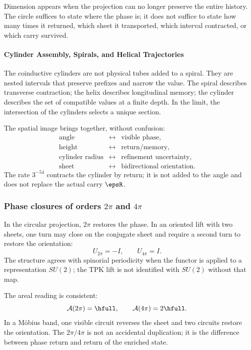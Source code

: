 \begin{narrativebox}
Dimension appears when the projection can no longer preserve the entire
history. The circle suffices to state where the phase is; it does not
suffice to state how many times it returned, which sheet it transported,
which interval contracted, or which carry survived.
\end{narrativebox}

\paragraph{Cylinder Assembly, Spirals, and Helical Trajectories}

The coinductive cylinders are not physical tubes added to a spiral. They are
nested intervals that preserve prefixes and narrow the value. The spiral
describes transverse contraction; the helix describes longitudinal memory;
the cylinder describes the set of compatible values at a finite
depth. In the limit, the intersection of the cylinders selects a unique
section.

The spatial image brings together, without confusion:
\[
\begin{array}{ccl}
\text{angle} &\leftrightarrow& \text{visible phase},\\
\text{height} &\leftrightarrow& \text{return/memory},\\
\text{cylinder radius} &\leftrightarrow& \text{refinement uncertainty},\\
\text{sheet} &\leftrightarrow& \text{bidirectional orientation}.
\end{array}
\]
The rate \(3^{-54}\) contracts the cylinder by return; it is not added to the angle and
does not replace the actual carry \(\epsR\).

\subsubsection{Phase closures of orders \(2\pi\) and \(4\pi\)}

In the circular projection, \(2\pi\) restores the phase. In an oriented lift
with two sheets, one turn may close on the conjugate sheet and require a
second turn to restore the orientation:
\[
U_{2\pi}=-I,\qquad U_{4\pi}=I.
\]
The structure agrees with spinorial periodicity when the
functor is applied to a representation \(SU(2)\); the TPK lift is not identified with
\(SU(2)\) without that map.

The areal reading is consistent:
\[
\mathcal A(2\pi)=\hfull,\qquad
\mathcal A(4\pi)=2\hfull.
\]
In a Möbius band, one visible circuit reverses the sheet and two circuits
restore the orientation. The \(2\pi/4\pi\) is not an accidental duplication;
it is the difference between phase return and return of the enriched state.
